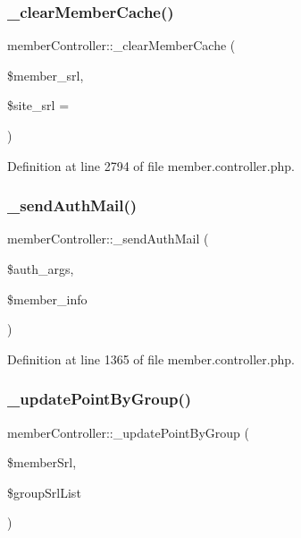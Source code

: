 \subsubsection{\texorpdfstring{\+\_\+clear\+Member\+Cache()}{\_clearMemberCache()}}
{\footnotesize\ttfamily member\+Controller\+::\+\_\+clear\+Member\+Cache (\begin{DoxyParamCaption}\item[{}]{\$member\+\_\+srl,  }\item[{}]{\$site\+\_\+srl = {} }\end{DoxyParamCaption})}



Definition at line 2794 of file member.\+controller.\+php.

\mbox{\label{classmemberController_a8768cc1066bf70222fdd0f0fa2d55d31}} 
\subsubsection{\texorpdfstring{\+\_\+send\+Auth\+Mail()}{\_sendAuthMail()}}
{\footnotesize\ttfamily member\+Controller\+::\+\_\+send\+Auth\+Mail (\begin{DoxyParamCaption}\item[{}]{\$auth\+\_\+args,  }\item[{}]{\$member\+\_\+info }\end{DoxyParamCaption})}



Definition at line 1365 of file member.\+controller.\+php.

\mbox{\label{classmemberController_abe9b21621506198b75656781e6919dba}} 
\subsubsection{\texorpdfstring{\+\_\+update\+Point\+By\+Group()}{\_updatePointByGroup()}}
{\footnotesize\ttfamily member\+Controller\+::\+\_\+update\+Point\+By\+Group (\begin{DoxyParamCaption}\item[{}]{\$member\+Srl,  }\item[{}]{\$group\+Srl\+List }\end{DoxyParamCaption})}



